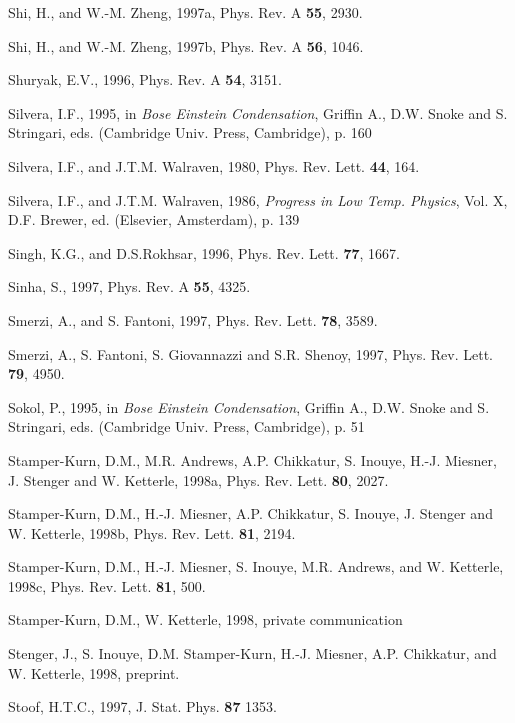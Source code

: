 \begin{references}
     Shi, H., and W.-M. Zheng, 1997a, Phys. Rev. A {\bf
55}, 2930. 

     Shi, H., and W.-M. Zheng, 1997b, Phys. Rev. A {\bf
56}, 1046.

   Shuryak, E.V., 1996, Phys. Rev. A {\bf 54}, 3151.

  Silvera, I.F., 1995, in {\it Bose Einstein
Condensation}, Griffin A., D.W.  Snoke and S. Stringari, eds. (Cambridge
Univ.  Press, Cambridge), p. 160

  Silvera, I.F., and J.T.M. Walraven, 1980, Phys.
Rev. Lett. {\bf 44}, 164.

  Silvera, I.F., and J.T.M. Walraven, 1986, {\it
Progress in Low Temp. Physics}, Vol. X, D.F. Brewer, ed. (Elsevier,
Amsterdam), p. 139

      Singh, K.G., and D.S.Rokhsar, 1996, Phys. Rev.
Lett. {\bf 77}, 1667.  

      Sinha, S., 1997, Phys. Rev. A {\bf 55}, 4325. 

     Smerzi, A., and S. Fantoni, 1997, Phys. Rev.
Lett. {\bf 78}, 3589.

    Smerzi, A., S. Fantoni, S. Giovannazzi and
S.R. Shenoy, 1997, Phys. Rev. Lett. {\bf 79}, 4950. 

      Sokol, P., 1995, in {\it Bose Einstein
Condensation}, Griffin A., D.W.  Snoke and S. Stringari, eds. (Cambridge
Univ.  Press, Cambridge), p. 51

      Stamper-Kurn, D.M., M.R. Andrews, A.P. Chikkatur,
S. Inouye, H.-J. Miesner, J. Stenger and W. Ketterle, 1998a, Phys. Rev.
Lett. {\bf 80}, 2027.

      Stamper-Kurn, D.M., H.-J. Miesner, A.P. Chikkatur,
S. Inouye,  J. Stenger and W. Ketterle, 1998b, Phys. Rev. Lett. {\bf 81},
2194. 

   Stamper-Kurn, D.M., H.-J. Miesner, S. Inouye,
M.R. Andrews, and W. Ketterle, 1998c, Phys. Rev. Lett. {\bf 81}, 500. 

   Stamper-Kurn, D.M., W. Ketterle, 1998, private
communication

  Stenger, J., S. Inouye, D.M. Stamper-Kurn, H.-J.
Miesner, A.P. Chikkatur, and W. Ketterle, 1998, preprint.

 Stoof, H.T.C., 1997, J. Stat. Phys. {\bf 87} 1353.


\end{references}
